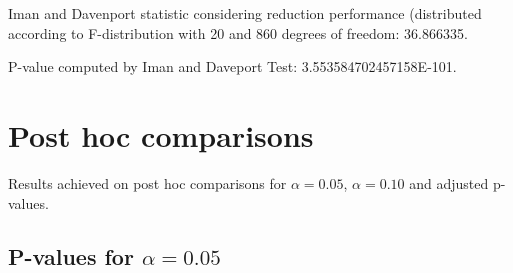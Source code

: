 \documentclass[a4paper,10pt]{article}
\begin{document}
\begin{landscape}
Iman and Davenport statistic considering reduction performance (distributed according to F-distribution with 20 and 860 degrees of freedom: 36.866335.

P-value computed by Iman and Daveport Test: 3.553584702457158E-101.\newline



\pagebreak

\section{Post hoc comparisons}

Results achieved on post hoc comparisons for $\alpha = 0.05$, $\alpha = 0.10$ and adjusted p-values.

\subsection{P-values for $\alpha=0.05$}


\end{landscape}
\end{document}
